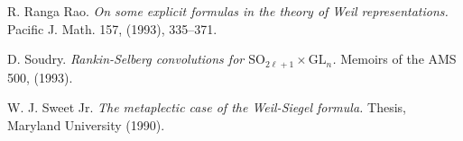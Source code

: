 \documentclass[12pts]{amsart}
\newcommand{\GL}{{\mathrm{GL}}}
\newcommand{\SO}{{\mathrm{SO}}}
\begin{document}
\begin{thebibliography}{}
	R. Ranga Rao. \textit{On some explicit formulas in the theory of Weil representations.} Pacific J. Math. 157, (1993), 335--371.
	
	D. Soudry. \textit{Rankin-Selberg convolutions for $\SO_{2\ell+1}\times \GL_n$.} Memoirs of the AMS 500, (1993).
	
W. J. Sweet Jr. \textit{The metaplectic case of the Weil-Siegel formula.} Thesis, Maryland University (1990).


	
	
	
	
	
	
	
	
	
	
\end{thebibliography}
\end{document}
